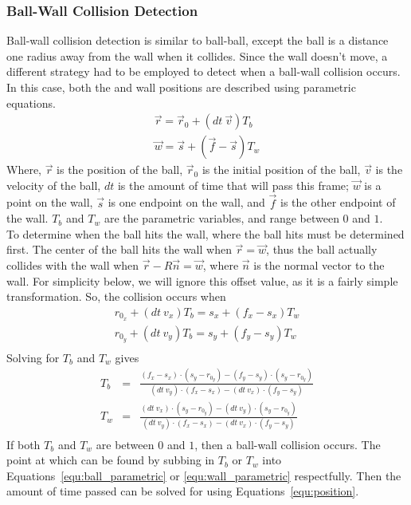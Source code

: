 \documentclass[12pt]{article}
\begin{document}
            \subsubsection{Ball-Wall Collision Detection}
            Ball-wall collision detection is similar to ball-ball, except the ball is a distance one radius away from the wall when it collides.
            Since the wall doesn't move, a different strategy had to be employed to detect when a ball-wall collision occurs. In this case,
            both the and wall positions are described using parametric equations.
            \begin{eqnarray}
                \vec r = \vec r_0 + (dt~\vec v) T_b         \label{equ:ball_parametric} \\
                \vec w = \vec s + (\vec f - \vec s) T_w     \label{equ:wall_parametric}
            \end{eqnarray}
            Where, $\vec r$ is the position of the ball, $\vec r_0$ is the initial position of the ball, $\vec v$ is the velocity of the ball,
            $dt$ is the amount of time that will pass this frame; $\vec w$ is a point on the wall, $\vec s$ is one endpoint on the wall, and $\vec f$
            is the other endpoint of the wall. $T_b$ and $T_w$ are the parametric variables, and range between $0$ and $1$. \\
            To determine when the ball hits the wall, where the ball hits must be determined first. The center of the ball hits the wall when
            $\vec r = \vec w$, thus the ball actually collides with the wall when $\vec r - R \vec n = \vec w$, where $\vec n$ is the normal
            vector to the wall. For simplicity below, we will ignore this offset value, as it is a fairly simple transformation. So, the collision
            occurs when
            \begin{eqnarray}
                r_{0_x} + (dt~v_x) T_b = s_x + (f_x - s_x) T_w  \nonumber \\
                r_{0_y} + (dt~v_y) T_b = s_y + (f_y - s_y) T_w  \nonumber \\
            \end{eqnarray}
            Solving for $T_b$ and $T_w$ gives
            \begin{eqnarray}
                T_b &=& \frac{(f_x - s_x)\cdot(s_y - r_{0_y}) - (f_y - s_y)\cdot(s_y - r_{0_y})}{(dt~v_y)\cdot(f_x - s_x) - (dt~v_x)\cdot(f_y - s_y)} \nonumber \\
                T_w &=& \frac{(dt~v_x)\cdot(s_y - r_{0_y}) - (dt~v_y)\cdot(s_y - r_{0_y})}{(dt~v_y)\cdot(f_x - s_x) - (dt~v_x)\cdot(f_y - s_y)} \nonumber \\
            \end{eqnarray}
            If both $T_b$ and $T_w$ are between $0$ and $1$, then a ball-wall collision occurs. The point at which can be found by subbing in $T_b$ or $T_w$
            into Equations~\ref{equ:ball_parametric} or \ref{equ:wall_parametric} respectfully. Then the amount of time passed can be solved for using Equations~\ref{equ:position}.
        
\end{document}
